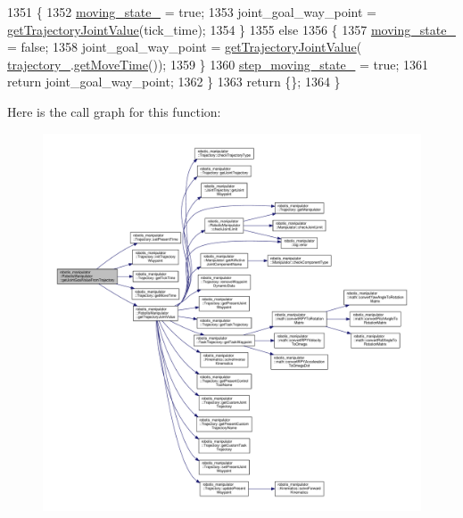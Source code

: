 \begin{DoxyCode}
1351     \{
1352       \hyperlink{classrobotis__manipulator_1_1_robotis_manipulator_a5b7990548dd779b1ca66a2ad83a74f76}{moving\_state\_} = \textcolor{keyword}{true};
1353       joint\_goal\_way\_point = \hyperlink{classrobotis__manipulator_1_1_robotis_manipulator_a94f13f3855b973d213a260e097b25fa2}{getTrajectoryJointValue}(tick\_time);
1354     \}
1355     \textcolor{keywordflow}{else}
1356     \{
1357       \hyperlink{classrobotis__manipulator_1_1_robotis_manipulator_a5b7990548dd779b1ca66a2ad83a74f76}{moving\_state\_} = \textcolor{keyword}{false};
1358       joint\_goal\_way\_point =  \hyperlink{classrobotis__manipulator_1_1_robotis_manipulator_a94f13f3855b973d213a260e097b25fa2}{getTrajectoryJointValue}(
      \hyperlink{classrobotis__manipulator_1_1_robotis_manipulator_a992d2c7221bcaab8e9a688d12728d738}{trajectory\_}.\hyperlink{classrobotis__manipulator_1_1_trajectory_a998cdbaa9895e9a3ea6c7ec49f7b47d9}{getMoveTime}());
1359     \}
1360     \hyperlink{classrobotis__manipulator_1_1_robotis_manipulator_aef8766eb10814f57928dcd9e71ceaccf}{step\_moving\_state\_} = \textcolor{keyword}{true};
1361     \textcolor{keywordflow}{return} joint\_goal\_way\_point;
1362   \}
1363   \textcolor{keywordflow}{return} \{\};
1364 \}
\end{DoxyCode}


Here is the call graph for this function\+:\nopagebreak
\begin{figure}[H]
\begin{center}
\leavevmode
\includegraphics[width=350pt]{classrobotis__manipulator_1_1_robotis_manipulator_a78ce7a7754a99409c082e9124403cb62_cgraph}
\end{center}
\end{figure}


